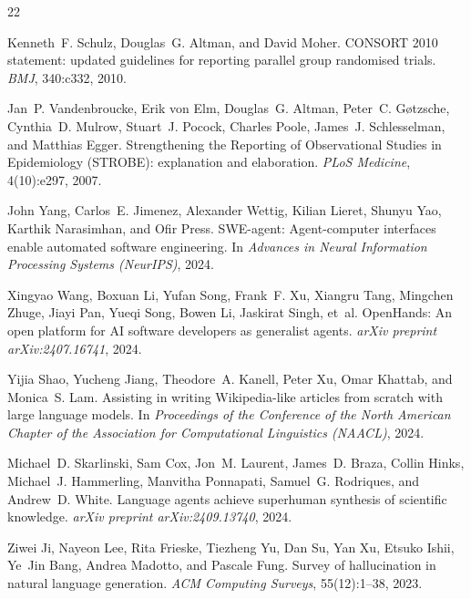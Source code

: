 \documentclass[11pt,a4paper]{article}
\begin{document}
\begin{thebibliography}{22}
\setlength{\itemsep}{2pt}

Kenneth~F. Schulz, Douglas~G. Altman, and David Moher.
\newblock CONSORT 2010 statement: updated guidelines for reporting parallel group randomised trials.
\newblock \emph{BMJ}, 340:c332, 2010.

Jan~P. Vandenbroucke, Erik von Elm, Douglas~G. Altman, Peter~C. G{\o}tzsche, Cynthia~D. Mulrow, Stuart~J. Pocock, Charles Poole, James~J. Schlesselman, and Matthias Egger.
\newblock Strengthening the Reporting of Observational Studies in Epidemiology (STROBE): explanation and elaboration.
\newblock \emph{PLoS Medicine}, 4(10):e297, 2007.

John Yang, Carlos~E. Jimenez, Alexander Wettig, Kilian Lieret, Shunyu Yao, Karthik Narasimhan, and Ofir Press.
\newblock SWE-agent: Agent-computer interfaces enable automated software engineering.
\newblock In \emph{Advances in Neural Information Processing Systems (NeurIPS)}, 2024.

Xingyao Wang, Boxuan Li, Yufan Song, Frank~F. Xu, Xiangru Tang, Mingchen Zhuge, Jiayi Pan, Yueqi Song, Bowen Li, Jaskirat Singh, et~al.
\newblock OpenHands: An open platform for AI software developers as generalist agents.
\newblock \emph{arXiv preprint arXiv:2407.16741}, 2024.

Yijia Shao, Yucheng Jiang, Theodore~A. Kanell, Peter Xu, Omar Khattab, and Monica~S. Lam.
\newblock Assisting in writing Wikipedia-like articles from scratch with large language models.
\newblock In \emph{Proceedings of the Conference of the North American Chapter of the Association for Computational Linguistics (NAACL)}, 2024.

Michael~D. Skarlinski, Sam Cox, Jon~M. Laurent, James~D. Braza, Collin Hinks, Michael~J. Hammerling, Manvitha Ponnapati, Samuel~G. Rodriques, and Andrew~D. White.
\newblock Language agents achieve superhuman synthesis of scientific knowledge.
\newblock \emph{arXiv preprint arXiv:2409.13740}, 2024.

Ziwei Ji, Nayeon Lee, Rita Frieske, Tiezheng Yu, Dan Su, Yan Xu, Etsuko Ishii, Ye~Jin Bang, Andrea Madotto, and Pascale Fung.
\newblock Survey of hallucination in natural language generation.
\newblock \emph{ACM Computing Surveys}, 55(12):1--38, 2023.


\end{thebibliography}
\end{document}
